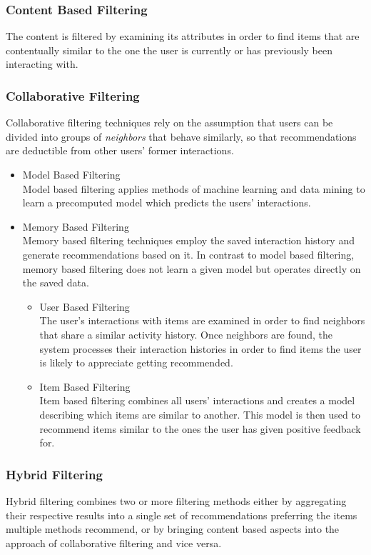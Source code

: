 \subsubsection{Content Based Filtering}
	The content is filtered by examining its attributes in order to find items that are contentually similar to the one the user is currently or has previously been interacting with.
\subsubsection{Collaborative Filtering}
	Collaborative filtering techniques rely on the assumption that users can be divided into groups of \textit{neighbors} that behave similarly, so that recommendations are deductible from other users' former interactions.
	\begin{itemize}
		\item Model Based Filtering\\
		Model based filtering applies methods of machine learning and data mining to learn a precomputed model which predicts the users' interactions.
		\item Memory Based Filtering\\
		Memory based filtering techniques employ the saved interaction history and generate recommendations based on it. In contrast to model based filtering, memory based filtering does not learn a given model but operates directly on the saved data.
		\begin{itemize}
			\item User Based Filtering\\
			The user's interactions with items are examined in order to find neighbors that share a similar activity history. Once neighbors are found, the system processes their interaction histories in order to find items the user is likely to appreciate getting recommended.
			\item Item Based Filtering\\
			Item based filtering combines all users' interactions and creates a model describing which items are similar to another. This model is then used to recommend items similar to the ones the user has given positive feedback for.
		\end{itemize}
	\end{itemize}
\subsubsection{Hybrid Filtering}
Hybrid filtering combines two or more filtering methods either by aggregating their respective results into a single set of recommendations preferring the items multiple methods recommend, or by bringing content based aspects into the approach of collaborative filtering and vice versa.

